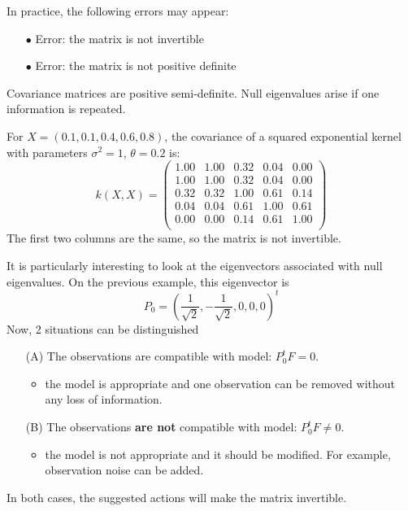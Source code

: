 \documentclass{beamer}
\begin{document}
\begin{frame}{}
In practice, the following errors may appear:\\
\begin{itemize}
	\item[\alert{$\bullet$}] \alert{Error: the matrix is not invertible}
	\item[\alert{$\bullet$}] \alert{Error: the matrix is not positive definite}
\end{itemize}
Covariance matrices are positive semi-definite. Null eigenvalues arise if one information is repeated.
\begin{example}
 For $X=(0.1,0.1,0.4,0.6,0.8)$, the covariance of a squared exponential kernel with parameters $\sigma^2=1$, $\theta = 0.2$ is: 
 \begin{equation*}
 k(X,X) = 
 \begin{pmatrix}
	1.00 & 1.00 & 0.32 & 0.04 & 0.00 \\
	1.00 & 1.00 & 0.32 & 0.04 & 0.00 \\
	0.32 & 0.32 & 1.00 & 0.61 & 0.14 \\
	0.04 & 0.04 & 0.61 & 1.00 & 0.61 \\
	0.00 & 0.00 & 0.14 & 0.61 & 1.00 \\
 \end{pmatrix}
 \end{equation*}
 The first two columns are the same, so the matrix is not invertible.
\end{example}
\end{frame}

\begin{frame}{}
It is particularly interesting to look at the eigenvectors associated with null eigenvalues. On the previous example, this eigenvector is 
\begin{equation*}
P_0 = \left( \frac{1}{\sqrt{2}},-\frac{1}{\sqrt{2}},0,0,0 \right)^t
\end{equation*}
Now, 2 situations can be distinguished\\ \vspace{2mm}
\begin{itemize}
	\item[(A)] The observations are compatible with model: $P_0^t F = 0$.
	\begin{itemize}
		\item the model is appropriate and one observation can be removed without any loss of information.
	\end{itemize}
	\item[(B)] The observations \textbf{are not} compatible with model: $P_0^t F \neq 0$.
		\begin{itemize}
			\item the model is not appropriate and it should be modified. For example, observation noise can be added.
		\end{itemize}
\end{itemize}
In both cases, the suggested actions will make the matrix invertible.
\end{frame}
\end{document}
